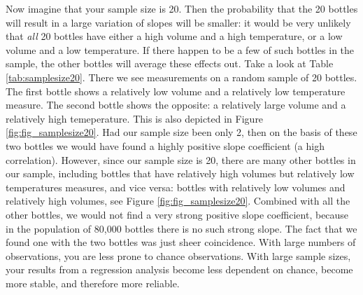 \documentclass[]{book}\usepackage[]{graphicx}\usepackage[]{color}
\begin{document}
Now imagine that your sample size is 20. Then the probability that the 20 bottles will result in a large variation of slopes will be smaller: it would be very unlikely that \textit{all} 20 bottles have either a high volume and a high temperature, or a low volume and a low temperature. If there happen to be a few of such bottles in the sample, the other bottles will average these effects out. Take a look at Table \ref{tab:samplesize20}. There we see measurements on a random sample of 20 bottles. The first bottle shows a relatively low volume and a relatively low temperature measure. The second bottle shows the opposite: a relatively large volume and a relatively high temeperature. This is also depicted in Figure \ref{fig:fig_samplesize20}. Had our sample size been only 2, then on the basis of these two bottles we would have found a highly positive slope coefficient (a high correlation). However, since our sample size is 20, there are many other bottles in our sample, including bottles that have relatively high volumes but relatively low temperatures measures, and vice versa: bottles with relatively low volumes and relatively high volumes, see Figure \ref{fig:fig_samplesize20}. Combined with all the other bottles, we would not find a very strong positive slope coefficient, because in the population of 80,000 bottles there is no such strong slope. The fact that we found one with the two bottles was just sheer coincidence. With large numbers of observations, you are less prone to chance observations. With large sample sizes, your results from a regression analysis become less dependent on chance, become more stable, and therefore more reliable. 
\end{document}
